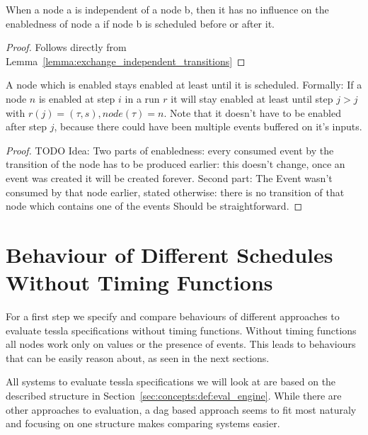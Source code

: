 \begin{lemma}[name = Influence of Independent Nodes]\label{lemma:independent_nodes}
  When a node a is independent of a node b, then it has no influence on the enabledness of node a if node b is scheduled before or after it.
\end{lemma}

\begin{proof}
  Follows directly from Lemma~\ref{lemma:exchange_independent_transitions}
\end{proof}

\begin{lemma}[name = Duration of Enabledness]\label{lemma:enabled_till_scheduled}
  A node which is enabled stays enabled at least until it is scheduled.
  Formally: If a node \(n\) is enabled at step \(i\) in a run \(r\) it will stay enabled at least until step \(j > j\) with \(r(j) = (\tau,s), \mathit{node}(\tau) = n\).
  Note that it doesn't have to be enabled after step \(j\), because there could have been multiple events buffered on it's inputs.
\end{lemma}

\begin{proof}
TODO Idea: Two parts of enabledness: every consumed event by the transition of the node has to be produced earlier: this doesn't change, once an event was created it will be created forever.
Second part: The Event wasn't consumed by that node earlier, stated otherwise: there is no transition of that node which contains one of the events
Should be straightforward.
\end{proof}


\section{Behaviour of Different Schedules Without Timing Functions}
\label{sec:concepts:behaviour_without_timing}

For a first step we specify and compare behaviours of different approaches to evaluate \gls{tessla} specifications without timing functions.
Without timing functions all nodes work only on values or the presence of events.
This leads to behaviours that can be easily reason about, as seen in the next sections.

All systems to evaluate \gls{tessla} specifications we will look at are based on the described structure in Section~\ref{sec:concepts:def:eval_engine}.
While there are other approaches to evaluation, a \gls{dag} based approach seems to fit most naturaly and focusing on one structure makes comparing systems easier.

